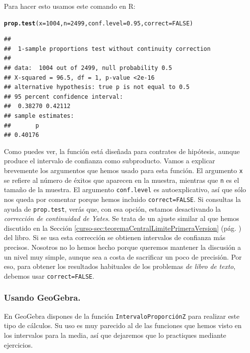 \documentclass[10pt,a4paper]{article}\usepackage[]{graphicx}\usepackage[]{color}
\makeatletter
\newcommand{\hlnum}[1]{\textcolor[rgb]{0.686,0.059,0.569}{#1}}%
\newcommand{\hlstd}[1]{\textcolor[rgb]{0.345,0.345,0.345}{#1}}%
\newcommand{\hlkwc}[1]{\textcolor[rgb]{0.333,0.667,0.333}{#1}}%
\newcommand{\hlkwd}[1]{\textcolor[rgb]{0.737,0.353,0.396}{\textbf{#1}}}%
\newenvironment{kframe}{%
 \def\at@end@of@kframe{}%
 \ifinner\ifhmode%
  \def\at@end@of@kframe{\end{minipage}}%
  \begin{minipage}{\columnwidth}%
 \fi\fi%
 \def\FrameCommand##1{\hskip\@totalleftmargin \hskip-\fboxsep
 \colorbox{shadecolor}{##1}\hskip-\fboxsep
     \hskip-\linewidth \hskip-\@totalleftmargin \hskip\columnwidth}%
 \MakeFramed {\advance\hsize-\width
   \@totalleftmargin\z@ \linewidth\hsize
   \@setminipage}}%
 {\par\unskip\endMakeFramed%
 \at@end@of@kframe}
\newenvironment{knitrout}{}{} %
\newcounter {cont01}
\makeatother
\begin{document}
Para hacer esto usamos este comando en R:
\begin{knitrout}
\color{fgcolor}\begin{kframe}
\begin{alltt}
\hlkwd{prop.test}\hlstd{(}\hlkwc{x}\hlstd{=}\hlnum{1004}\hlstd{,} \hlkwc{n}\hlstd{=}\hlnum{2499}\hlstd{,} \hlkwc{conf.level}\hlstd{=}\hlnum{0.95}\hlstd{,} \hlkwc{correct}\hlstd{=}\hlnum{FALSE}\hlstd{)}
\end{alltt}
\begin{verbatim}
## 
## 	1-sample proportions test without continuity correction
## 
## data:  1004 out of 2499, null probability 0.5
## X-squared = 96.5, df = 1, p-value <2e-16
## alternative hypothesis: true p is not equal to 0.5
## 95 percent confidence interval:
##  0.38270 0.42112
## sample estimates:
##       p 
## 0.40176
\end{verbatim}
\end{kframe}
\end{knitrout}

Como puedes ver, la función está diseñada para contrates de hipótesis, aunque produce el intervalo de confianza como subproducto. Vamos a explicar brevemente los argumentos que hemos usado para esta función. El argumento {\tt x} se refiere al número de éxitos que aparecen en la muestra, mientras que {\tt n} es el tamaño de la muestra. El argumento {\tt conf.level} es autoexplicativo, así que sólo nos queda por comentar porque hemos incluido {\tt correct=FALSE}. Si consultas la ayuda de {\tt prop.test}, verás que, con esa opción, estamos desactivando la {\em corrección de continuidad de Yates}. Se trata de un ajuste similar al que hemos discutido en la Sección \ref{curso-sec:teoremaCentralLimitePrimeraVersion} (pág. \pageref{curso-sec:teoremaCentralLimitePrimeraVersion}) del libro. Si se usa esta corrección se obtienen intervalos de confianza más precisos. Nosotros no lo hemos hecho porque queremos mantener la discusión a un nivel muy simple, aunque sea a costa de sacrificar un poco de precisión. Por eso, para obtener los resultados habituales de los problemas {\em de libro de texto}, debemos usar {\tt correct=FALSE}.

\subsubsection*{Usando GeoGebra.}

En GeoGebra dispones de la función {\tt IntervaloProporciónZ} para realizar este tipo de cálculos. Su uso es muy parecido al de las funciones que hemos visto en los intervalos para la media, así que dejaremos que lo practiques mediante ejercicios.
\end{document}
